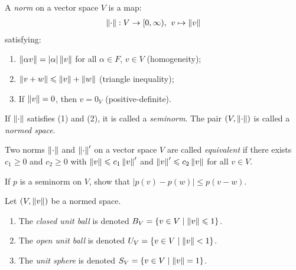     \begin{definition}
        A \textit{norm} on a vector space $V$ is a map:
            \begin{equation*}
            \begin{split}
                \lnorm \cdot \rnorm :V \rightarrow [0,\infty), \h4 v \mapsto \lnorm v \rnorm
            \end{split}
            \end{equation*}
        satisfying:
            \begin{enumerate}[label = (\arabic*),itemsep=1pt,topsep=3pt]
                \item $\lnorm \alpha v \rnorm = |\alpha| \lnorm v \rnorm$ for all $\alpha \in F$, $v \in V$ (homogeneity);
                \item $\lnorm v + w \rnorm \leq \lnorm v \rnorm + \lnorm w \rnorm$ (triangle inequality);
                \item If $\lnorm v \rnorm = 0$, then $v = 0_V$ (positive-definite).
            \end{enumerate}
        If $\lnorm \cdot \rnorm$ satisfies (1) and (2), it is called a \textit{seminorm}. The pair $(V, \lnorm \cdot \rnorm)$ is called a \textit{normed space}.
    \end{definition}

    \begin{definition}
        Two norms $\lnorm \cdot \rnorm$ and $\lnorm \cdot \rnorm'$ on a vector space $V$ are called \textit{equivalent} if there exists $c_1 \geq 0$ and $c_2 \geq 0$ with $\lnorm v \rnorm \leq c_1 \lnorm v \rnorm'$ and $\lnorm v \rnorm' \leq c_2 \lnorm v \rnorm$ for all $v \in V$.
    \end{definition}

    \begin{exercise}
        If $p$ is a seminorm on $V$, show that $|p(v) - p(w)| \leq p(v-w)$.
    \end{exercise}

    \begin{definition}
        Let $(V, \lnorm v \rnorm)$ be a normed space.
            \begin{enumerate}[label = (\arabic*),itemsep=1pt,topsep=3pt]
                \item The \textit{closed unit ball} is denoted $B_V = \{v \in V \mid \lnorm v \rnorm \leq 1\}$.
                \item The \textit{open unit ball} is denoted $U_V = \{v \in V \mid \lnorm v \rnorm < 1\}$.
                \item The \textit{unit sphere} is denoted $S_V = \{v \in V \mid \lnorm v \rnorm = 1\}$. 
            \end{enumerate}
    \end{definition}

